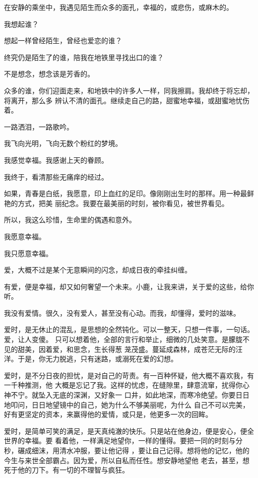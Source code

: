 \documentclass[12pt,a4paper]{article}
\begin{document}
		在安静的乘坐中，我遇见陌生而众多的面孔，幸福的，或悲伤，或麻木的。

		我想起谁？\par
		想起一样曾经陌生，曾经也爱恋的谁？\par
		终究仍是陌生了的谁，陪我在地铁里寻找出口的谁？\par
		不是想念，想念该是芳香的。

		众多的谁，你们迎面走来，和地铁中的许多人一样，同我擦肩。我却终于将忘却，将离开，那么多
	辨认不清的面孔。继续走自己的路，甜蜜地幸福，或甜蜜地忧伤着。

		一路洒泪，一路歌吟。\par
		我飞向光明，飞向无数个粉红的梦境。\par
		我感觉幸福。我感谢上天的眷顾。\par
		我终于，看清那些无痛痒的经过。

		如果，青春是白纸，我愿意，印上血红的足印。像刚刚出生时的那样。用一种最鲜艳的方式，把美
	丽纪念。我要在最美丽的时刻，被你看见，被世界看见。

		所以，我这么珍惜，生命里的偶遇和意外。

		我愿意幸福。

		我只愿意幸福。

	\endwriting



		爱，大概不过是某个无意瞬间的闪念，却成日夜的牵挂纠缠。

		有爱，便是幸福，却又如何奢望一个未来。小鹿，让我来讲，关于爱的这些，给你听。

		我没有爱情。很久，没有爱人，甚至没有心动。而我，却懂得，爱时的滋味。

		爱时，是无休止的混乱，是思想的全然钝化。可以一整天，只想一件事，一句话。爱，让人变傻。
	只可以想着他，全部的言行和举止，细微的几处笑意。是朦胧不见的甜美，因着爱，和思念，生长得葱
	茏茂盛。蔓延成森林，成苍茫无际的汪洋。于是，你无力脱逃，只有迷路，或溺死在爱的幻想。

		爱时，是不分日夜的担忧，是对自己的苛责。有一百种怀疑，他大概不喜欢我，有一千种推测，他
	大概是忘记了我。这样的忧虑，在缝隙里，肆意流窜，扰得你心神不宁。就坠入无底的深渊，又好象一
	口井，如此地深，而寒冷绝望。你要日日地叩问，日日地望镜中的自己，她为什么不够美丽呢，为什么
	自己不可以完美，好有更坚定的资本，来赢得他的爱情，或只是，他更多一次的回眸。

		爱时，是简单可笑的满足，是天真纯澈的快乐。只是站在他身边，便是安心，便全世界的幸福。要
	看着他，一样满足地望你，一样的懂得。要把一同的时刻与分秒，碾成细沫，用清水冲服，要让他记得
	，要让自己记得。想将他的记忆，他的今生与来世全部霸占。因为爱，所以自私而任性。想安静地望他
	老去，甚至，想死于他的刀下。有一切的不理智与疯狂。
\end{document}
